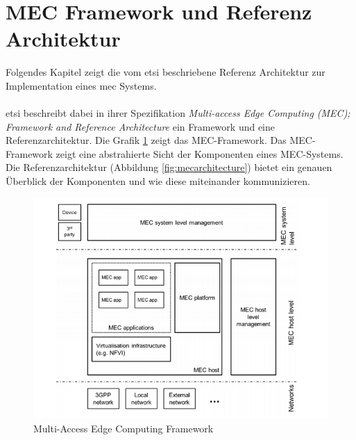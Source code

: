 \documentclass[runningheads]{llncs}
\numberwithin{figure}{section}
\begin{document}
\newpage
\section{MEC Framework und Referenz Architektur}
\label{subsec:MEC Framework - Referenz Architektur}
Folgendes Kapitel zeigt die vom \acrfull{etsi} beschriebene
Referenz Architektur zur Implementation eines \acrshort{mec} Systems. 
\\ 
\\
\acrshort{etsi} beschreibt dabei in ihrer Spezifikation \textit{Multi-access Edge Computing (MEC); 
Framework and Reference Architecture} \cite{etsiETSIGSMEC} ein Framework und eine 
Referenzarchitektur. Die Grafik \ref{fig:MecFramework} zeigt das MEC-Framework. 
Das MEC-Framework zeigt eine abstrahierte Sicht der Komponenten eines MEC-Systems. 
Die Referenzarchitektur (Abbildung \ref{fig:mecarchitecture}) bietet 
ein genauen Überblick der Komponenten und wie diese miteinander kommunizieren.


\begin{figure}
  \includegraphics[width=\linewidth]{images/MecFramework.png}
  \caption{Multi-Access Edge Computing Framework \cite{etsiMultiaccessEdgeComputinga}}
  \label{fig:MecFramework}
\end{figure}
\end{document}
